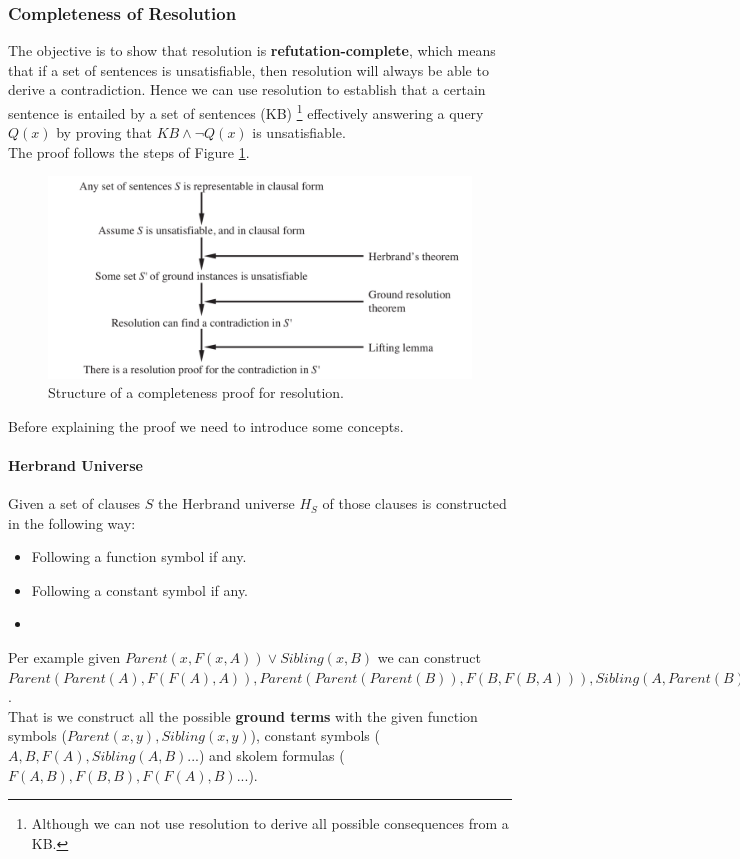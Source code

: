 \documentclass[10pt,a4paper]{article}
\begin{document}
\begin{itemize}
\subsubsection{Completeness of Resolution}
The objective is to show that resolution is \textbf{refutation-complete}, which means that if a set of sentences is unsatisfiable, then resolution will always be able to derive a contradiction. Hence we can use resolution to establish that a certain sentence is entailed by a set of sentences (KB) \footnote{Although we can not use resolution to derive all possible consequences from a KB.} effectively answering a query $Q(x)$ by proving that $KB \wedge \neg Q(x)$ is unsatisfiable.\\
The proof follows the steps of Figure \ref{fig:fol_res_complete}.

\begin{figure}[H]
\includegraphics[scale=0.5]{images/fol_res_complete.png}
\caption{Structure of a completeness proof for resolution.}
\label{fig:fol_res_complete}
\end{figure}

Before explaining the proof we need to introduce some concepts.
\paragraph{Herbrand Universe}
Given a  set of clauses $S$ the Herbrand universe $H_S$ of those clauses is constructed in the following way:
\begin{itemize}
\item Following a function symbol if any.
\item Following a constant symbol if any.
\item 
\end{itemize}
Per example given $Parent(x,F(x,A))\vee Sibling(x,B)$ we can construct $Parent(Parent(A),F(F(A),A)),Parent(Parent(Parent(B)),F(B,F(B,A))),Sibling(A,Parent(B))....$.\\
That is we construct all the possible \textbf{ground terms} with the given function symbols ($Parent(x,y),Sibling(x,y)$), constant symbols ($A,B,F(A),Sibling(A,B)...$) and skolem formulas ($F(A,B),F(B,B),F(F(A),B)...$). 


\end{itemize}
\end{document}
